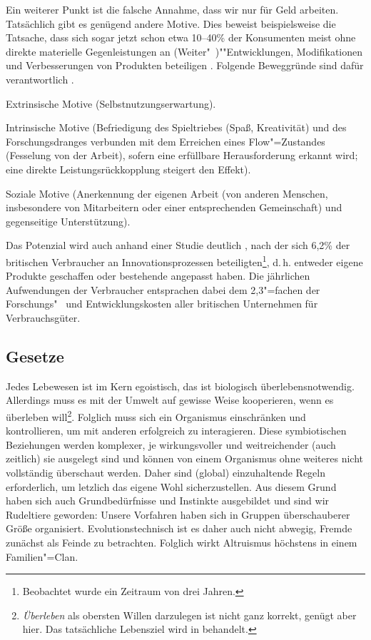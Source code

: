 Ein weiterer Punkt ist die falsche Annahme, dass wir nur für Geld arbeiten. Tatsächlich gibt es genügend andere Motive. Dies beweist beispielsweise die Tatsache, dass sich sogar jetzt schon etwa 10--40\% der Konsumenten meist ohne direkte materielle Gegenleistungen an (Weiter"~)""Entwicklungen, Modifikationen und Verbesserungen von Produkten beteiligen \citep[S.~11]{piller_oi_2006}. Folgende Beweggründe sind dafür verantwortlich \citep[SS.~11--13]{piller_oi_2006}.
\begin{compactitem}
\item Extrinsische Motive (Selbstnutzungserwartung).
\item Intrinsische Motive (Befriedigung des Spieltriebes (Spaß, Kreativität) und des Forschungsdranges verbunden mit dem Erreichen eines Flow"=Zustandes (Fesselung von der Arbeit), sofern eine erfüllbare Herausforderung erkannt wird; eine direkte Leistungsrückkopplung steigert den Effekt).
\item Soziale Motive (Anerkennung der eigenen Arbeit (von anderen Menschen, insbesondere von Mitarbeitern oder einer entsprechenden Gemeinschaft) und gegenseitige Unterstützung).
\end{compactitem}
Das Potenzial wird auch anhand einer Studie deutlich \citep{hippel_2010}, nach der sich 6,2\% der britischen Verbraucher an Innovationsprozessen beteiligten\footnote{Beobachtet wurde ein Zeitraum von drei Jahren.}, d.\,h. entweder eigene Produkte geschaffen oder bestehende angepasst haben. Die jährlichen Aufwendungen der Verbraucher entsprachen dabei dem 2,3"=fachen der Forschungs"~ und Entwicklungskosten aller britischen Unternehmen für Verbrauchsgüter.

\subsection{Gesetze}\label{sec:situation/laws}

Jedes Lebewesen ist im Kern egoistisch, das ist biologisch überlebensnotwendig. Allerdings muss es mit der Umwelt auf gewisse Weise kooperieren, wenn es überleben will\footnote{\textit{Überleben} als obersten Willen darzulegen ist nicht ganz korrekt, genügt aber hier. Das tatsächliche Lebensziel wird in  behandelt.}. Folglich muss sich ein Organismus einschränken und kontrollieren, um mit anderen erfolgreich zu interagieren. Diese symbiotischen Beziehungen werden komplexer, je wirkungsvoller und weitreichender (auch zeitlich) sie ausgelegt sind und können von einem Organismus ohne weiteres nicht vollständig überschaut werden. Daher sind (global) einzuhaltende Regeln erforderlich, um letzlich das eigene Wohl sicherzustellen. Aus diesem Grund haben sich auch Grundbedürfnisse und Instinkte ausgebildet und sind wir Rudeltiere geworden: Unsere Vorfahren haben sich in Gruppen überschauberer Größe organisiert. Evolutionstechnisch ist es daher auch nicht abwegig, Fremde zunächst als Feinde zu betrachten. Folglich wirkt Altruismus höchstens in einem Familien"=Clan.

